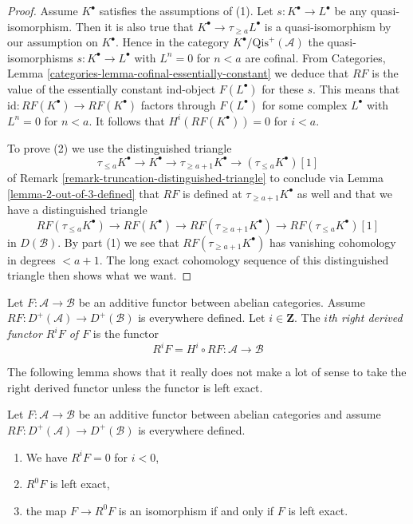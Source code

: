 \begin{proof}
Assume $K^\bullet$ satisfies the assumptions of (1).
Let $s : K^\bullet \to L^\bullet$ be any quasi-isomorphism.
Then it is also true that $K^\bullet \to \tau_{\geq a}L^\bullet$
is a quasi-isomorphism by our assumption on $K^\bullet$.
Hence in the category $K^\bullet/\text{Qis}^{+}(\mathcal{A})$ the
quasi-isomorphisms $s : K^\bullet \to L^\bullet$ with $L^n = 0$
for $n < a$ are cofinal. From Categories, Lemma
\ref{categories-lemma-cofinal-essentially-constant}
we deduce that $RF$ is the value of the essentially constant
ind-object $F(L^\bullet)$ for these $s$. This means that
$\text{id} : RF(K^\bullet) \to RF(K^\bullet)$ factors through
$F(L^\bullet)$ for some complex $L^\bullet$ with $L^n = 0$
for $n < a$. It follows that $H^i(RF(K^\bullet)) = 0$ for $i < a$.

\medskip\noindent
To prove (2) we use the distinguished triangle
$$
\tau_{\leq a}K^\bullet \to K^\bullet \to \tau_{\geq a + 1}K^\bullet
\to (\tau_{\leq a}K^\bullet)[1]
$$
of Remark \ref{remark-truncation-distinguished-triangle} to conclude
via Lemma \ref{lemma-2-out-of-3-defined} that
$RF$ is defined at $\tau_{\geq a + 1}K^\bullet$ as well and that we have
a distinguished triangle
$$
RF(\tau_{\leq a}K^\bullet) \to RF(K^\bullet) \to RF(\tau_{\geq a + 1}K^\bullet)
\to RF(\tau_{\leq a}K^\bullet)[1]
$$
in $D(\mathcal{B})$. By part (1) we see that $RF(\tau_{\geq a + 1}K^\bullet)$
has vanishing cohomology in degrees $< a + 1$. The long exact cohomology
sequence of this distinguished triangle then shows what we want.
\end{proof}

\begin{definition}
\label{definition-higher-derived-functors}
Let $F : \mathcal{A} \to \mathcal{B}$ be an additive functor
between abelian categories. Assume
$RF : D^{+}(\mathcal{A}) \to D^{+}(\mathcal{B})$ is everywhere
defined. Let $i \in \mathbf{Z}$.
The {\it $i$th right derived functor $R^iF$ of $F$} is the functor
$$
R^iF = H^i \circ RF :
\mathcal{A}
\longrightarrow
\mathcal{B}
$$
\end{definition}

\noindent
The following lemma shows that it really does not make a lot
of sense to take the right derived functor unless the functor
is left exact.

\begin{lemma}
\label{lemma-left-exact-higher-derived}
Let $F : \mathcal{A} \to \mathcal{B}$ be an additive functor
between abelian categories and assume
$RF : D^{+}(\mathcal{A}) \to D^{+}(\mathcal{B})$ is everywhere
defined.
\begin{enumerate}
\item We have $R^iF = 0$ for $i < 0$,
\item $R^0F$ is left exact,
\item the map $F \to R^0F$ is an isomorphism if and
only if $F$ is left exact.
\end{enumerate}
\end{lemma}

